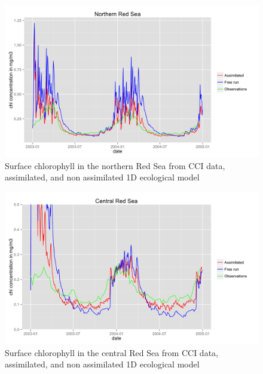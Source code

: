 \begin{figure}
    \centering
    \includegraphics[scale=.15]{figures/chl_models2.png}
    \caption{Surface chlorophyll in the northern Red Sea from CCI data,
             assimilated, and non assimilated 1D ecological model}
    \label{chl_models2}
\end{figure}

\begin{figure}
    \centering
    \includegraphics[scale=.15]{figures/chl_models1.png}
    \caption{Surface chlorophyll in the central Red Sea from CCI data,
             assimilated, and non assimilated 1D ecological model}
    \label{chl_models1}
\end{figure}

